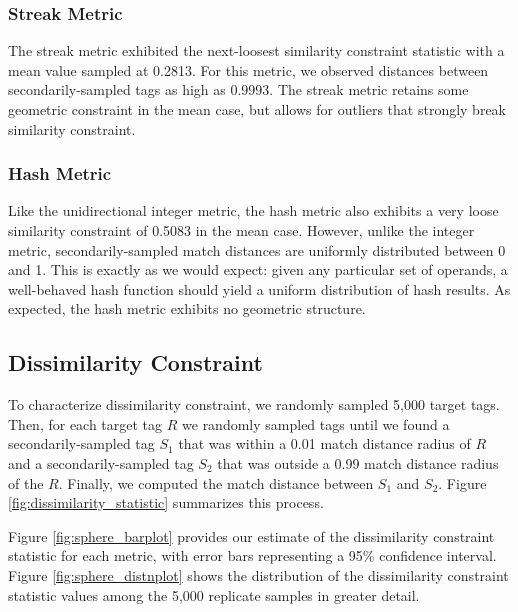 \subsubsection{Streak Metric}

The streak metric exhibited the next-loosest similarity constraint statistic with a mean value sampled at 0.2813.
For this metric, we observed distances between secondarily-sampled tags as high as 0.9993.
The streak metric retains some geometric constraint in the mean case, but allows for outliers that strongly break similarity constraint.

\subsubsection{Hash Metric}

Like the unidirectional integer metric, the hash metric also exhibits a very loose similarity constraint of 0.5083 in the mean case.
However, unlike the integer metric, secondarily-sampled match distances are uniformly distributed between 0 and 1.
This is exactly as we would expect:
given any particular set of operands, a well-behaved hash function should yield a uniform distribution of hash results.
As expected, the hash metric exhibits no geometric structure.

\subsection{Dissimilarity Constraint} \label{sec:dissimilarityconstraint}


% 

To characterize dissimilarity constraint, we randomly sampled 5,000 target tags.
Then, for each target tag $R$ we randomly sampled tags until we found a secondarily-sampled tag $S_1$ that was within a 0.01 match distance radius of $R$ and a secondarily-sampled tag $S_2$ that was outside a 0.99 match distance radius of the $R$.
Finally, we computed the match distance between $S_1$ and $S_2$.
Figure \ref{fig:dissimilarity_statistic} summarizes this process.

Figure \ref{fig:sphere_barplot} provides our estimate of the dissimilarity constraint statistic for each metric, with error bars representing a 95\% confidence interval.
Figure \ref{fig:sphere_distnplot} shows the distribution of the dissimilarity constraint statistic values among the 5,000 replicate samples in greater detail.

